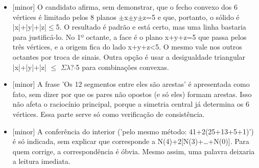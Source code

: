 \documentclass{article}%
\begin{document}
\begin{itemize}%
\item%
{[}minor{]} O candidato afirma, sem demonstrar, que o fecho convexo dos 6 vértices é limitado pelos 8 planos $\pm$x$\pm$y$\pm$z=5 e que, portanto, o sólido é |x|+|y|+|z|$\leq$5. O resultado é padrão e está certo, mas uma linha bastaria para justificá{-}lo. No 1º octante, a face é o plano x+y+z=5 que passa pelos três vértices, e a origem fica do lado x+y+z<5. O mesmo vale nos outros octantes por troca de sinais. Outra opção é usar a desigualdade triangular |x|+|y|+|z| $\leq$ $\Sigma$$\lambda$?$\cdot$5 para combinações convexas.%
\item%
{[}minor{]} A frase 'Os 12 segmentos entre eles são arestas' é apresentada como fato, sem dizer por que os pares não opostos (e só eles) formam arestas. Isso não afeta o raciocínio principal, porque a simetria central já determina os 6 vértices. Essa parte serve só como verificação de consistência.%
\item%
{[}minor{]} A conferência do interior ('pelo mesmo método: 41+2(25+13+5+1)') é só indicada, sem explicar que corresponde a N(4)+2{[}N(3)+\ldots{}+N(0){]}. Para quem corrige, a correspondência é óbvia. Mesmo assim, uma palavra deixaria a leitura imediata.%
\end{itemize}%
\end{document}
